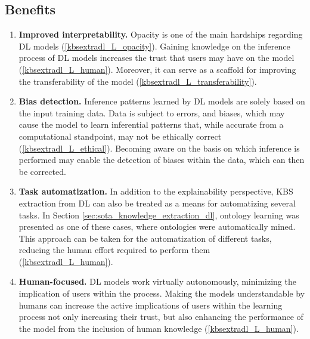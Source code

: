 \subsection{Benefits}
\begin{enumerate} [start=1,label={\bfseries B\arabic*.}]
    \item \textbf{Improved interpretability.}\label{kbsextradl_B_interpretability} Opacity is one of the main hardships regarding DL models (\ref{kbsextradl_L_opacity}). Gaining knowledge on the inference process of DL models increases the trust that users may have on the model (\ref{kbsextradl_L_human}). Moreover, it can serve as a scaffold for improving the transferability of the model (\ref{kbsextradl_L_transferability}).
    
    \item \textbf{Bias detection.}\label{kbsextradl_B_bias} Inference patterns learned by DL models are solely based on the input training data. Data is subject to errors, and biases, which may cause the model to learn inferential patterns that, while accurate from a computational standpoint, may not be ethically correct (\ref{kbsextradl_L_ethical}). Becoming aware on the basis on which inference is performed may enable the detection of biases within the data, which can then be corrected.
    
    \item \textbf{Task automatization.}\label{kbsextradl_B_automatization} In addition to the explainability perspective, KBS extraction from DL can also be treated as a means for automatizing several tasks. In Section \ref{sec:sota_knowledge_extraction_dl}, ontology learning was presented as one of these cases, where ontologies were automatically mined. This approach can be taken for the automatization of different tasks, reducing the human effort required to perform them (\ref{kbsextradl_L_human}).
    
    \item \textbf{Human-focused.}\label{kbsextradl_B_human} DL models work virtually autonomously, minimizing the implication of users within the process. Making the models understandable by humans can increase the active implications of users within the learning process not only increasing their trust, but also enhancing the performance of the model from the inclusion of human knowledge (\ref{kbsextradl_L_human}). 
\end{enumerate}

